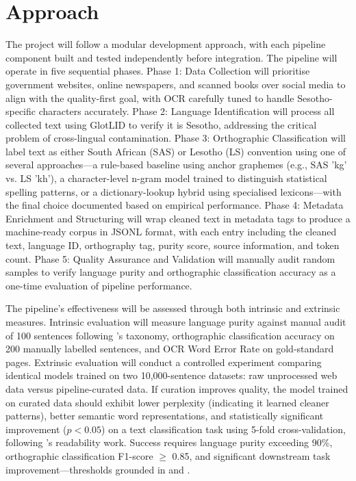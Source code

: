 \documentclass[12pt]{ThesisRU}
\begin{document}
\section{Approach}
The project will follow a modular development approach, with each pipeline component built and tested independently before integration. The pipeline will operate in five sequential phases. Phase 1: Data Collection will prioritise government websites, online newspapers, and scanned books over social media to align with the quality-first goal, with OCR carefully tuned to handle Sesotho-specific characters accurately. Phase 2: Language Identification will process all collected text using GlotLID \citep{kargaran2023glotlid} to verify it is Sesotho, addressing the critical problem of cross-lingual contamination. Phase 3: Orthographic Classification will label text as either South African (SAS) or Lesotho (LS) convention using one of several approaches—a rule-based baseline using anchor graphemes (e.g., SAS 'kg' vs. LS 'kh'), a character-level n-gram model trained to distinguish statistical spelling patterns, or a dictionary-lookup hybrid using specialised lexicons—with the final choice documented based on empirical performance. Phase 4: Metadata Enrichment and Structuring will wrap cleaned text in metadata tags to produce a machine-ready corpus in JSONL format, with each entry including the cleaned text, language ID, orthography tag, purity score, source information, and token count. Phase 5: Quality Assurance and Validation will manually audit random samples to verify language purity and orthographic classification accuracy as a one-time evaluation of pipeline performance.

The pipeline's effectiveness will be assessed through both intrinsic and extrinsic measures. Intrinsic evaluation will measure language purity against manual audit of 100 sentences following \citet{kreutzer-etal-2022-quality}'s taxonomy, orthographic classification accuracy on 200 manually labelled sentences, and OCR Word Error Rate on gold-standard pages. Extrinsic evaluation will conduct a controlled experiment comparing identical models trained on two 10,000-sentence datasets: raw unprocessed web data versus pipeline-curated data. If curation improves quality, the model trained on curated data should exhibit lower perplexity (indicating it learned cleaner patterns), better semantic word representations, and statistically significant improvement ($p < 0.05$) on a text classification task using 5-fold cross-validation, following \citet{Sibeko2024}'s readability work. Success requires language purity exceeding 90\%, orthographic classification F1-score $\geq$ 0.85, and significant downstream task improvement—thresholds grounded in \citet{kreutzer-etal-2022-quality} and \citet{Makutoane2022}.
\vspace{1em}
\end{document}
